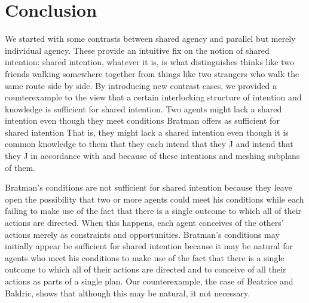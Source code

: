\documentclass[12pt,\papersize]{extarticle}
\begin{document}
%
%
%


\section{Conclusion}
We started with some contrasts between shared agency and parallel but merely individual agency.
These provide an intuitive fix on the notion of shared intention: 
 shared intention, whatever it is, is what distinguishes thinks like two friends walking somewhere together from things like two strangers who walk the same route side by side.
By introducing new contrast cases,
we provided a counterexample to the view that a certain interlocking structure of intention and knowledge is sufficient for shared intention. 
Two agents might lack a shared intention even though they meet conditions Bratman offers as sufficient for shared intention
That is, they might lack a shared intention even though it is common knowledge to them that they  each intend that they J and intend that they J in accordance with and because of these intentions and meshing subplans of them.

Bratman's conditions are not sufficient for shared intention because they leave open the possibility that two or more agents could meet his conditions while each failing to make use of the fact that there is a single outcome to which all of their actions are directed.
When this happens, each agent conceives of the others' actions merely as constraints and opportunities.
Bratman's conditions may initially appear be sufficient for shared intention because it may be natural for agents who meet his conditions to make use of the fact that there is a single outcome to which all of their actions are directed and  to conceive of all their actions as parts of a single plan. 
Our counterexample, the case of Beatrice and Baldric, shows that although this may be natural, it not necessary.
\end{document}
